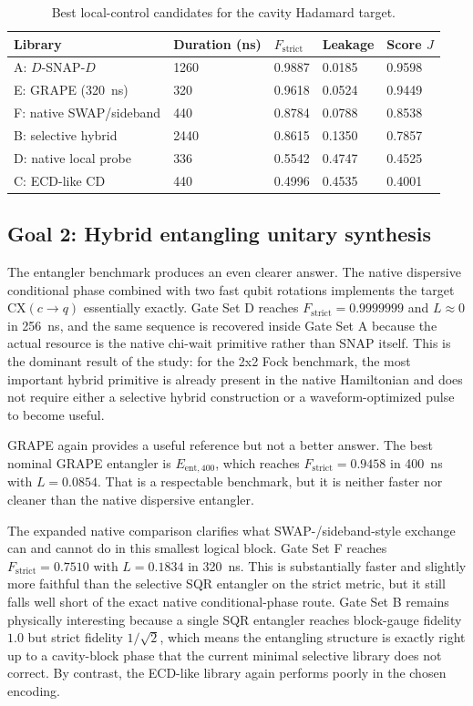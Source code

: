 \documentclass[11pt, a4paper]{article}
\begin{document}
\begin{table}[H]
  \centering
  \caption{Best local-control candidates for the cavity Hadamard target.}
  \label{tab:local}
  \begin{tabular}{@{} l l l l l @{}}
    \toprule
    Library & Duration (ns) & \(F_{\mathrm{strict}}\) & Leakage & Score \(J\) \\
    \midrule
    A: \(D\)-SNAP-\(D\) & 1260 & 0.9887 & 0.0185 & 0.9598 \\
    E: GRAPE (\SI{320}{ns}) & 320 & 0.9618 & 0.0524 & 0.9449 \\
    F: native SWAP/sideband & 440 & 0.8784 & 0.0788 & 0.8538 \\
    B: selective hybrid & 2440 & 0.8615 & 0.1350 & 0.7857 \\
    D: native local probe & 336 & 0.5542 & 0.4747 & 0.4525 \\
    C: ECD-like CD & 440 & 0.4996 & 0.4535 & 0.4001 \\
    \bottomrule
  \end{tabular}
\end{table}

\subsection{Goal 2: Hybrid entangling unitary synthesis}
The entangler benchmark produces an even clearer answer. The native dispersive
conditional phase combined with two fast qubit rotations implements the target
\(\mathrm{CX}(c\rightarrow q)\) essentially exactly. Gate Set D reaches
\(F_{\mathrm{strict}}=0.9999999\) and \(L\approx 0\) in \SI{256}{ns}, and the
same sequence is recovered inside Gate Set A because the actual resource is the
native chi-wait primitive rather than SNAP itself. This is the dominant result
of the study: for the 2x2 Fock benchmark, the most important hybrid primitive is
already present in the native Hamiltonian and does not require either a
selective hybrid construction or a waveform-optimized pulse to become useful.

GRAPE again provides a useful reference but not a better answer. The best
nominal GRAPE entangler is \(E_{\mathrm{ent},400}\), which reaches
\(F_{\mathrm{strict}}=0.9458\) in \SI{400}{ns} with \(L=0.0854\). That is a
respectable benchmark, but it is neither faster nor cleaner than the native
dispersive entangler.

The expanded native comparison clarifies what SWAP-/sideband-style exchange can
and cannot do in this smallest logical block. Gate Set F reaches
\(F_{\mathrm{strict}}=0.7510\) with \(L=0.1834\) in \SI{320}{ns}. This is
substantially faster and slightly more faithful than the selective SQR entangler
on the strict metric, but it still falls well short of the exact native
conditional-phase route. Gate Set B remains physically interesting because a
single SQR entangler reaches block-gauge fidelity \(1.0\) but strict fidelity
\(1/\sqrt{2}\), which means the entangling structure is exactly right up to a
cavity-block phase that the current minimal selective library does not correct.
By contrast, the ECD-like library again performs poorly in the chosen encoding.
\end{document}
